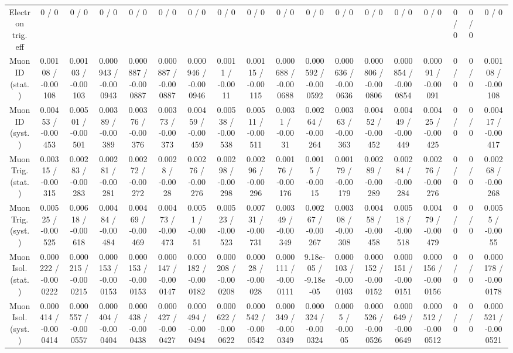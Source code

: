 \documentclass[10pt]{article}
\begin{document}
\begin{table}[htbp]
\begin{center}
\begin{tabular}{|c|c|c|c|c|c|c|c|c|c|c|c|c|c|c|c|c|c|}
  Electron trig. eff & 0 / 0 & 0 / 0 & 0 / 0 & 0 / 0 & 0 / 0 & 0 / 0 & 0 / 0 & 0 / 0 & 0 / 0 & 0 / 0 & 0 / 0 & 0 / 0 & 0 / 0 & 0 / 0 & 0 / 0 & 0 / 0 & 0 / 0 \\ 
  Muon ID (stat.) & 0.00108 / -0.00108 & 0.00103 / -0.00103 & 0.000943 / -0.000943 & 0.000887 / -0.000887 & 0.000887 / -0.000887 & 0.000946 / -0.000946 & 0.0011 / -0.0011 & 0.00115 / -0.00115 & 0.000688 / -0.000688 & 0.000592 / -0.000592 & 0.000636 / -0.000636 & 0.000806 / -0.000806 & 0.000854 / -0.000854 & 0.00091 / -0.00091 & 0 / 0 & 0 / 0 & 0.00108 / -0.00108 \\ 
  Muon ID (syst.) & 0.00453 / -0.00453 & 0.00501 / -0.00501 & 0.00389 / -0.00389 & 0.00376 / -0.00376 & 0.00373 / -0.00373 & 0.00459 / -0.00459 & 0.00538 / -0.00538 & 0.00511 / -0.00511 & 0.0031 / -0.0031 & 0.00264 / -0.00264 & 0.00363 / -0.00363 & 0.00452 / -0.00452 & 0.00449 / -0.00449 & 0.00425 / -0.00425 & 0 / 0 & 0 / 0 & 0.00417 / -0.00417 \\ 
  Muon Trig. (stat.) & 0.00315 / -0.00315 & 0.00283 / -0.00283 & 0.00281 / -0.00281 & 0.00272 / -0.00272 & 0.0028 / -0.0028 & 0.00276 / -0.00276 & 0.00298 / -0.00298 & 0.00296 / -0.00296 & 0.00176 / -0.00176 & 0.0015 / -0.0015 & 0.00179 / -0.00179 & 0.00289 / -0.00289 & 0.00284 / -0.00284 & 0.00276 / -0.00276 & 0 / 0 & 0 / 0 & 0.00268 / -0.00268 \\ 
  Muon Trig. (syst.) & 0.00525 / -0.00525 & 0.00618 / -0.00618 & 0.00484 / -0.00484 & 0.00469 / -0.00469 & 0.00473 / -0.00473 & 0.0051 / -0.0051 & 0.00523 / -0.00523 & 0.00731 / -0.00731 & 0.00349 / -0.00349 & 0.00267 / -0.00267 & 0.00308 / -0.00308 & 0.00458 / -0.00458 & 0.00518 / -0.00518 & 0.00479 / -0.00479 & 0 / 0 & 0 / 0 & 0.0055 / -0.0055 \\ 
  Muon Isol. (stat.) & 0.000222 / -0.000222 & 0.000215 / -0.000215 & 0.000153 / -0.000153 & 0.000153 / -0.000153 & 0.000147 / -0.000147 & 0.000182 / -0.000182 & 0.000208 / -0.000208 & 0.00028 / -0.00028 & 0.000111 / -0.000111 & 9.18e-05 / -9.18e-05 & 0.000103 / -0.000103 & 0.000152 / -0.000152 & 0.000151 / -0.000151 & 0.000156 / -0.000156 & 0 / 0 & 0 / 0 & 0.000178 / -0.000178 \\ 
  Muon Isol. (syst.) & 0.000414 / -0.000414 & 0.000557 / -0.000557 & 0.000404 / -0.000404 & 0.000438 / -0.000438 & 0.000427 / -0.000427 & 0.000494 / -0.000494 & 0.000622 / -0.000622 & 0.000542 / -0.000542 & 0.000349 / -0.000349 & 0.000324 / -0.000324 & 0.0005 / -0.0005 & 0.000526 / -0.000526 & 0.000649 / -0.000649 & 0.000512 / -0.000512 & 0 / 0 & 0 / 0 & 0.000521 / -0.000521 \\ 

\end{tabular}
\end{center}
\end{table}
\end{document}
